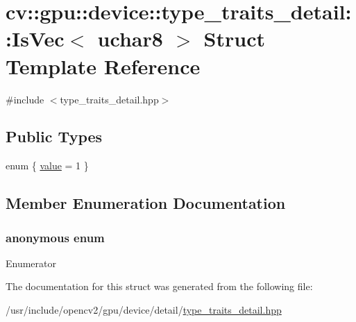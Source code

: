 \hypertarget{structcv_1_1gpu_1_1device_1_1type__traits__detail_1_1IsVec_3_01uchar8_01_4}{\section{cv\-:\-:gpu\-:\-:device\-:\-:type\-\_\-traits\-\_\-detail\-:\-:Is\-Vec$<$ uchar8 $>$ Struct Template Reference}
\label{structcv_1_1gpu_1_1device_1_1type__traits__detail_1_1IsVec_3_01uchar8_01_4}
}


{\ttfamily \#include $<$type\-\_\-traits\-\_\-detail.\-hpp$>$}

\subsection*{Public Types}
\begin{DoxyCompactItemize}
\item 
enum \{ \hyperlink{structcv_1_1gpu_1_1device_1_1type__traits__detail_1_1IsVec_3_01uchar8_01_4_a5d4db916d429f579577891a017ce2d9caa89b15f2d772a718aaeed6ab44093774}{value} = 1
 \}
\end{DoxyCompactItemize}


\subsection{Member Enumeration Documentation}
\hypertarget{structcv_1_1gpu_1_1device_1_1type__traits__detail_1_1IsVec_3_01uchar8_01_4_a5d4db916d429f579577891a017ce2d9c}{\subsubsection[{anonymous enum}]{\setlength{\rightskip}{0pt plus 5cm}anonymous enum}}\label{structcv_1_1gpu_1_1device_1_1type__traits__detail_1_1IsVec_3_01uchar8_01_4_a5d4db916d429f579577891a017ce2d9c}
\begin{Desc}
\item[Enumerator]\par
\begin{description}
\item[{\em 
\hypertarget{structcv_1_1gpu_1_1device_1_1type__traits__detail_1_1IsVec_3_01uchar8_01_4_a5d4db916d429f579577891a017ce2d9caa89b15f2d772a718aaeed6ab44093774}{value}\label{structcv_1_1gpu_1_1device_1_1type__traits__detail_1_1IsVec_3_01uchar8_01_4_a5d4db916d429f579577891a017ce2d9caa89b15f2d772a718aaeed6ab44093774}
}]\end{description}
\end{Desc}


The documentation for this struct was generated from the following file\-:\begin{DoxyCompactItemize}
\item 
/usr/include/opencv2/gpu/device/detail/\hyperlink{type__traits__detail_8hpp}{type\-\_\-traits\-\_\-detail.\-hpp}\end{DoxyCompactItemize}
